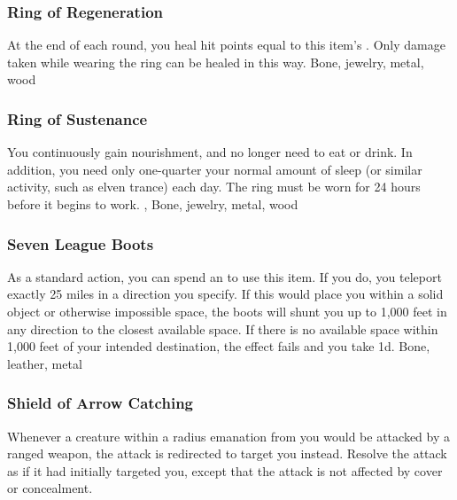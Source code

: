 \hypertarget{item:Ring of Regeneration}{\subsubsection{Ring of Regeneration\hfill{}}}
At the end of each round, you heal hit points equal to this item's .
Only damage taken while wearing the ring can be healed in this way.
 
 Bone, jewelry, metal, wood
\lowercase{\hypertarget{item:Ring of Sustenance}{}}\label{item:Ring of Sustenance}
\hypertarget{item:Ring of Sustenance}{\subsubsection{Ring of Sustenance\hfill{}}}
You continuously gain nourishment, and no longer need to eat or drink.
In addition, you need only one-quarter your normal amount of sleep (or similar activity, such as elven trance) each day.
The ring must be worn for 24 hours before it begins to work.
 , 
 Bone, jewelry, metal, wood
\lowercase{\hypertarget{item:Seven League Boots}{}}\label{item:Seven League Boots}
\hypertarget{item:Seven League Boots}{\subsubsection{Seven League Boots\hfill{}}}
As a standard action, you can spend an  to use this item.
If you do, you teleport exactly 25 miles in a direction you specify.
If this would place you within a solid object or otherwise impossible space, the boots will shunt you up to 1,000 feet in any direction to the closest available space.
If there is no available space within 1,000 feet of your intended destination, the effect fails and you take  \minus1d.
 
 Bone, leather, metal
\lowercase{\hypertarget{item:Shield of Arrow Catching}{}}\label{item:Shield of Arrow Catching}
\hypertarget{item:Shield of Arrow Catching}{\subsubsection{Shield of Arrow Catching\hfill{}}}
Whenever a creature within a \areamed radius emanation from you would be attacked by a ranged weapon, the attack is redirected to target you instead.
Resolve the attack as if it had initially targeted you, except that the attack is not affected by cover or concealment.
